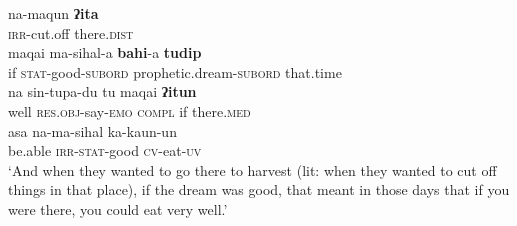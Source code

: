 \documentclass[output=paper
,modfonts
,nonflat]{langsci/langscibook}
\begin{document}
\begin{exe}
	\label{tx2-2}
	\begin{xlist}
		\ex\label{tx2-2a}
		\gll na-maqun  \textbf{ʔita}\\
		\textsc{irr}-cut.off  there.\textsc{dist}\\
		\ex\label{tx2-2b}
		\gll maqai  ma-sihal-a  \textbf{bahi}-a  \textbf{tudip}\\
		if  \textsc{stat}-good-\textsc{subord}  prophetic.dream-\textsc{subord}  that.time\\
		\ex\label{tx2-2c}
		\gll na  sin-tupa-du  tu  maqai  \textbf{ʔitun}\\
		well  \textsc{res}.\textsc{obj}-say-\textsc{emo}  \textsc{compl}  if  there.\textsc{med}\\
		\ex\label{tx2-2d}
		\gll asa  na-ma-sihal  ka-kaun-un\\
		be.able  \textsc{irr}-\textsc{stat}-good  \textsc{cv}-eat-\textsc{uv}\\
		\glt `And when they wanted to go there to harvest (lit: when they wanted to cut off things in that place), if the dream was good, that meant in those days that if you were there, you could eat very well.’
	\end{xlist}
\end{exe}\largerpage
\end{document}
